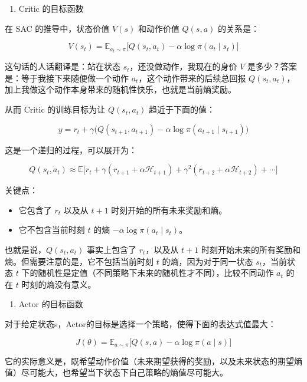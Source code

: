 \begin{enumerate}
\def\labelenumi{\arabic{enumi}.}
\tightlist
\item
  Critic 的目标函数
\end{enumerate}

在 SAC 的推导中，状态价值 \(V(s)\) 和动作价值 \(Q(s,a)\) 的关系是：

\[
V(s_t)
=
\mathbb{E}_{a_t\sim\pi}
\bigl[
Q(s_t,a_t)
-
\alpha\log\pi(a_t\mid s_t)
\bigr]
\]

这句话的人话翻译是：站在状态 \(s_t\)，还没做动作，我现在的身价 \(V\) 是多少？答案是：等于我接下来随便做一个动作 \(a_t\)，这个动作带来的后续总回报 \(Q(s_t,a_t)\)，加上我做这个动作本身带来的随机性快乐，也就是当前熵奖励。

从而 Critic 的训练目标为让 \(Q(s_t,a_t)\) 趋近于下面的值：

\[
y
=
r_t
+
\gamma
\bigl(
Q(s_{t+1},a_{t+1})
-
\alpha\log\pi(a_{t+1}\mid s_{t+1})
\bigr)
\]

这是一个递归的过程，可以展开为：

\[
Q(s_t,a_t)
\approx
\mathbb{E}
\bigl[
r_t
+
\gamma(r_{t+1}+\alpha\mathcal{H}_{t+1})
+
\gamma^{2}(r_{t+2}+\alpha\mathcal{H}_{t+2})
+
\cdots
\bigr]
\]

关键点：

\begin{itemize}
\tightlist
\item
  它包含了 \(r_t\) 以及从 \(t+1\) 时刻开始的所有未来奖励和熵。
\item
  它不包含当前时刻 \(t\) 的熵 \(-\alpha\log\pi(a_t\mid s_t)\)。
\end{itemize}

也就是说，\(Q(s_t,a_t)\) 事实上包含了 \(r_t\)，以及从 \(t+1\) 时刻开始未来的所有奖励和熵。但需要注意的是，它不包括当前时刻 \(t\) 的熵，因为对于同一状态 \(s_t\)，当前状态 \(t\) 下的随机性是定值（不同策略下未来的随机性才不同），比较不同动作 \(a_t\) 的在 \(t\) 时刻的熵没有意义。

\begin{enumerate}
\def\labelenumi{\arabic{enumi}.}
\setcounter{enumi}{1}
\tightlist
\item
  Actor 的目标函数
\end{enumerate}

对于给定状态s，Actor的目标是选择一个策略，使得下面的表达式值最大：

\[
J(\theta)
=
\mathbb{E}_{a\sim\pi}
\bigl[
Q(s,a)
-
\alpha\log\pi(a\mid s)
\bigr]
\]

它的实际意义是，既希望动作价值（未来期望获得的奖励，以及未来状态的期望熵值）尽可能大，也希望当下状态下自己策略的熵值尽可能大。


